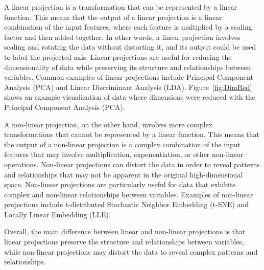 A linear projection is a transformation that can be represented by a
linear function. This means that the output of a linear projection is a
linear combination of the input features, where each feature is multiplied
by a scaling factor and then added together. In other words, a linear
projection involves scaling and rotating the data without distorting it,
and its output could be used to label the projected axis. Linear
projections are useful for reducing the dimensionality of data while
preserving its structure and relationships between variables. Common
examples of linear projections include Principal Component Analysis (PCA)
and Linear Discriminant Analysis (LDA). Figure~\ref{fig:DimRed} shows an
example visualization of data where dimensions were reduced with the
Principal Component Analysis (PCA). 

A non-linear projection, on the other hand, involves more complex
transformations that cannot be represented by a linear function. This
means that the output of a non-linear projection is a complex combination
of the input features that may involve multiplication, exponentiation, or
other non-linear operations. Non-linear projections can distort the data
in order to reveal patterns and relationships that may not be apparent in
the original high-dimensional space. Non-linear projections are
particularly useful for data that exhibits complex and non-linear
relationships between variables. Examples of non-linear projections
include t-distributed Stochastic Neighbor Embedding (t-SNE) and Locally
Linear Embedding (LLE).

Overall, the main difference between linear and non-linear projections is
that linear projections preserve the structure and relationships between
variables, while non-linear projections may distort the data to reveal
complex patterns and relationships.

